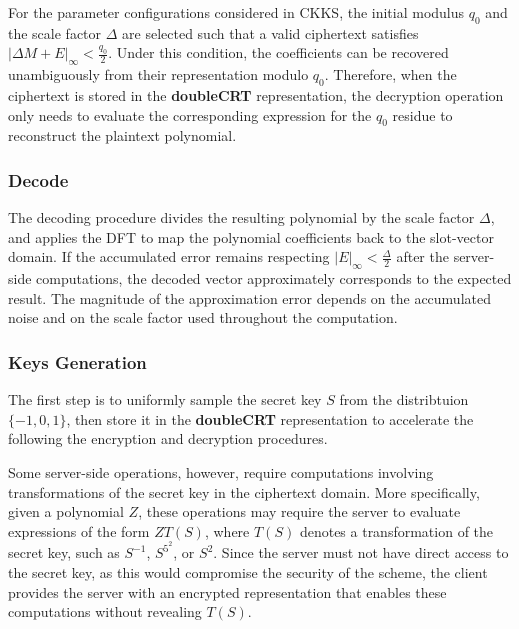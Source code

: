 For the parameter configurations considered in CKKS, the initial modulus $q_0$ and the scale factor $\Delta$ are selected such that a valid ciphertext satisfies $|\Delta M + E|_{\infty} < \frac{q_0}{2}$. Under this condition, the coefficients can be recovered unambiguously from their representation modulo $q_0$. Therefore, when the ciphertext is stored in the \textbf{doubleCRT} representation, the decryption operation only needs to evaluate the corresponding expression for the $q_0$ residue to reconstruct the plaintext polynomial.

\subsubsection{Decode}
\label{ckks:decode}

The decoding procedure divides the resulting polynomial by the scale factor $\Delta$, and applies the DFT to map the polynomial coefficients back to the slot-vector domain. If the accumulated error remains respecting $|E|_{\infty} < \frac{\Delta}{2}$ after the server-side computations, the decoded vector approximately corresponds to the expected result. The magnitude of the approximation error depends on the accumulated noise and on the scale factor used throughout the computation.

\subsubsection{Keys Generation}

The first step is to uniformly sample the secret key $S$ from the distribtuion $\{-1, 0, 1\}$, then store it in the \textbf{doubleCRT} representation to accelerate the following the encryption and decryption procedures. 


Some server-side operations, however, require computations involving transformations of the secret key in the ciphertext domain. More specifically, given a polynomial $Z$, these operations may require the server to evaluate expressions of the form $ZT(S)$, where $T(S)$ denotes a transformation of the secret key, such as $S^{-1}$, $S^{5^2}$, or $S^2$. Since the server must not have direct access to the secret key, as this would compromise the security of the scheme, the client provides the server with an encrypted representation that enables these computations without revealing $T(S)$.

